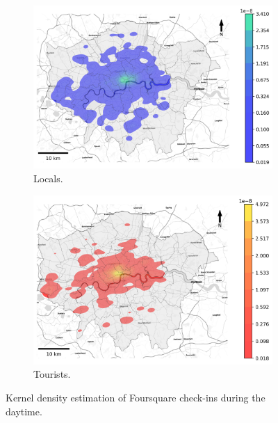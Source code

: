 \documentclass{article}
\theoremstyle{definition}
\theoremstyle{remark}
\begin{document}
\begin{figure}[!h]

\begin{subfigure}{0.5\textwidth}
\includegraphics[width=1\linewidth]{figures/kde_locals_daytime.png} 
\caption{Locals.}
\label{fig:kde_locals_daytime}
\end{subfigure}
\begin{subfigure}{0.5\textwidth}
\includegraphics[width=1\linewidth]{figures/kde_tourists_daytime.png}
\caption{Tourists.}
\label{fig:kde_tourists_daytime}
\end{subfigure}

\caption{Kernel density estimation of Foursquare check-ins during the daytime.} \label{fig:kde_daytime}
\end{figure}
\end{document}

